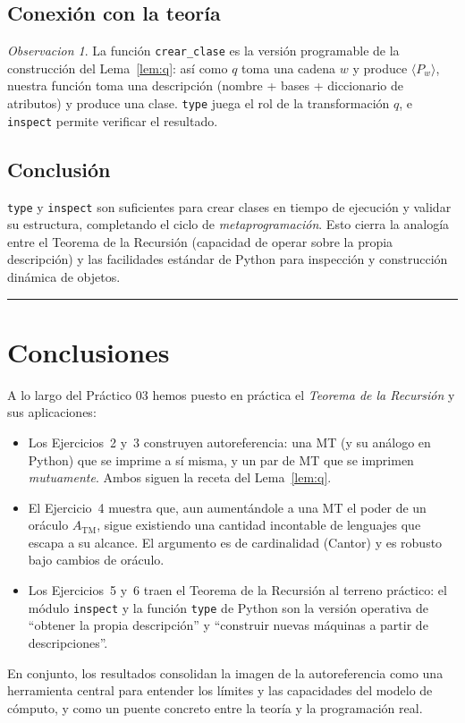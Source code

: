 \documentclass[11pt,a4paper]{article}
\theoremstyle{plain}
\theoremstyle{definition}
\theoremstyle{remark}
\newtheorem*{observacion}{Observacion}
\newcommand{\TM}{\mathrm{TM}}
\newcommand{\enc}[1]{\langle #1\rangle}
\newcommand{\ATM}{A_{\TM}}
\newcommand{\Pw}[1]{P_{#1}}
\begin{document}
\subsection*{Conexi\'on con la teor\'ia}

\begin{observacion}
La funci\'on \texttt{crear\_clase} es la versi\'on programable de la
construcci\'on del Lema~\ref{lem:q}: as\'i como $q$ toma una cadena $w$ y
produce $\enc{\Pw{w}}$, nuestra funci\'on toma una descripci\'on (nombre +
bases + diccionario de atributos) y produce una clase. \texttt{type} juega el
rol de la transformaci\'on $q$, e \texttt{inspect} permite verificar el
resultado.
\end{observacion}

\subsection*{Conclusi\'on}

\texttt{type} y \texttt{inspect} son suficientes para crear clases en tiempo
de ejecuci\'on y validar su estructura, completando el ciclo de
\emph{metaprogramaci\'on}. Esto cierra la analog\'ia entre el Teorema de la
Recursi\'on (capacidad de operar sobre la propia descripci\'on) y las
facilidades est\'andar de Python para inspecci\'on y construcci\'on
din\'amica de objetos.

\bigskip\hrule\bigskip

\section*{Conclusiones}

A lo largo del Pr\'actico 03 hemos puesto en pr\'actica el \emph{Teorema de
la Recursi\'on} y sus aplicaciones:

\begin{itemize}
  \item Los Ejercicios~2 y~3 construyen autoreferencia: una MT (y su an\'alogo
        en Python) que se imprime a s\'i misma, y un par de MT que se imprimen
        \emph{mutuamente}. Ambos siguen la receta del Lema~\ref{lem:q}.
  \item El Ejercicio~4 muestra que, aun aument\'andole a una MT el poder de
        un or\'aculo $\ATM$, sigue existiendo una cantidad incontable de
        lenguajes que escapa a su alcance. El argumento es de cardinalidad
        (Cantor) y es robusto bajo cambios de or\'aculo.
  \item Los Ejercicios~5 y~6 traen el Teorema de la Recursi\'on al terreno
        pr\'actico: el m\'odulo \texttt{inspect} y la funci\'on \texttt{type}
        de Python son la versi\'on operativa de ``obtener la propia
        descripci\'on'' y ``construir nuevas m\'aquinas a partir de
        descripciones''.
\end{itemize}

En conjunto, los resultados consolidan la imagen de la autoreferencia como
una herramienta central para entender los l\'imites y las capacidades del
modelo de c\'omputo, y como un puente concreto entre la teor\'ia y la
programaci\'on real.
\end{document}
